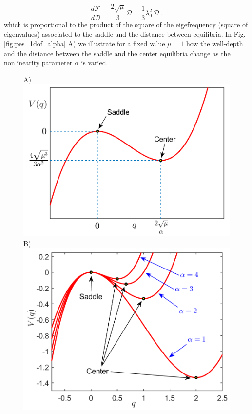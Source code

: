 \documentclass[8pt]{article}
\begin{document}
\begin{equation}
\dfrac{d \mathcal{F}}{d \mathcal{D}} = \dfrac{2\sqrt{\mu}}{3} \mathcal{D} = \frac{1}{3} \lambda_0^2 \, \mathcal{D} \; .
\end{equation}
which is proportional to the product of the square of the eigefrequency (square of eigenvalues) associated to the saddle and the distance between equilibria. In Fig. \ref{fig:pes_1dof_alpha} A) we illustrate for a fixed value $\mu = 1$ how the well-depth and the distance between the saddle and the center equilibria change as the nonlinearity parameter $\alpha$ is varied.

\begin{figure}[htbp]
	\begin{center}
		A)\includegraphics[scale=0.265]{fig4a}
		B)\includegraphics[scale=0.26]{fig4b} \\[.3cm]

\end{center}
\end{figure}
\end{document}
